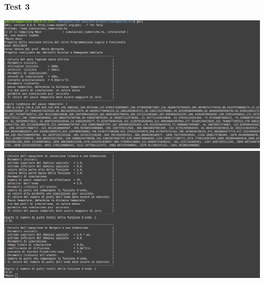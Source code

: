 \subsubsection*{Test 3}
\includegraphics[width=\textwidth,height=\textheight,keepaspectratio]{05_testing/image/hs/03_test/01_uno.png}
\\
\includegraphics[width=\textwidth,height=\textheight,keepaspectratio]{05_testing/image/hs/03_test/03_uno.png}

